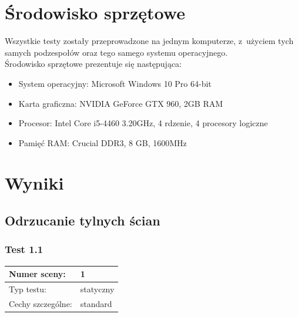 \documentclass[a4paper,twoside,12pt]{book}
\begin{document}
\section{Środowisko sprzętowe}
Wszystkie testy zostały przeprowadzone na jednym komputerze, z~użyciem tych samych podzespołów oraz tego samego systemu operacyjnego. \\
Środowisko sprzętowe prezentuje się następująca:
\begin{itemize}
    \item System operacyjny: Microsoft Windows 10 Pro 64-bit
    \item Karta graficzna: NVIDIA GeForce GTX 960, 2GB RAM
    \item Procesor: Intel Core i5-4460 3.20GHz, 4 rdzenie, 4 procesory logiczne
    \item Pamięć RAM: Crucial DDR3, 8 GB, 1600MHz
\end{itemize}

\section{Wyniki}
\label{section:wyniki}

\subsection{Odrzucanie tylnych ścian}

\subsubsection{Test 1.1}
\begin{tabular}{|l||l|}
\hline
Numer sceny: & 1 \\
\hline
Typ testu: & statyczny \\
\hline
Cechy szczególne: & standard \\
\hline
\end{tabular}\\

\vbox{}
\end{document}
